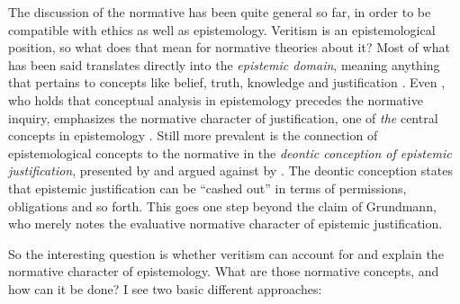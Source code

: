 \documentclass[12pt,numbers=noenddot]{scrartcl}
\begin{document}
The discussion of the normative has been quite general so far, in order to be compatible with ethics as well as epistemology. Veritism is an epistemological position, so what does that mean for normative theories about it? Most of what has been said translates directly into the \emph{epistemic domain}, meaning anything that pertains to concepts like belief, truth, knowledge and justification \autocite{David2001-DAVTAT-7}. Even \textcite[7]{grundmann2008}, who holds that conceptual analysis in epistemology precedes the normative inquiry, emphasizes the normative character of justification, one of \emph{the} central concepts in epistemology \autocite[226]{grundmann2008}. Still more prevalent is the connection of epistemological concepts to the normative in the \emph{deontic conception of epistemic justification}, presented by \textcite{Steup1988-STETDC} and argued against by \textcite{Alston1988-ALSTDC}. The deontic conception states that epistemic justification can be “cashed out” in terms of permissions, obligations and so forth. This goes one step beyond the claim of Grundmann, who merely notes the evaluative normative character of epistemic justification.

So the interesting question is whether veritism can account for and explain the normative character of epistemology. What are those normative concepts, and how can it be done? I see two basic different approaches:
\end{document}
